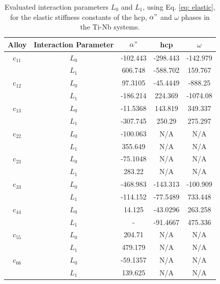 \newpage
\begin{table}[H]
	\caption{Evaluated interaction parameters $L_0$ and $L_1$, using Eq. \ref{eq: elastic}, for the elastic stiffness constants of the hcp, $\alpha"$ and $\omega$ phases in the Ti-Nb systems.}
	\centering
	\begin{tabular}{ c c c c c }
		\hline
		Alloy & Interaction Parameter & $\alpha"$ & hcp & $\omega$\\
		\hline
		c$_{11}$ & $L_{0}$ & -102.443 & -298.443 & -142.979 \\
		& $L_{1}$ & 606.748 & -588.702 & 159.767 \\
		c$_{12}$ & $L_{0}$ & 97.3105 & -45.4449 & -888.25 \\
		& $L_{1}$ & -186.214 & 224.369 & -1074.08 \\
		c$_{13}$ & $L_{0}$ & -11.5368 & 143.819 & 349.337 \\
		& $L_{1}$ & -307.745 & 250.29 & 275.297 \\
		c$_{22}$ & $L_{0}$ & -100.063 & N/A & N/A \\
		& $L_{1}$ & 355.649 & N/A & N/A \\
		c$_{23}$ & $L_{0}$ & -75.1048 & N/A & N/A \\
		& $L_{1}$ & 283.22 & N/A & N/A \\
		c$_{33}$ & $L_{0}$ & -468.983 & -143.313 & -100.909 \\
		& $L_{1}$ & -114.152 & -77.5489 & 733.448 \\
		c$_{44}$ & $L_{0}$ & 14.125 & -43.0296 & 263.258 \\
		& $L_{1}$ & - & -91.4667 & 475.336 \\
		c$_{55}$ & $L_{0}$ & 204.71 & N/A & N/A \\
		& $L_{1}$ & 479.179 & N/A & N/A \\
		c$_{66}$ & $L_{0}$ & -59.1357 & N/A & N/A \\
		& $L_{1}$ & 139.625 & N/A & N/A \\
		\hline
	\end{tabular}
	\label{Ch7-table:intpara}
\end{table}
\clearpage

